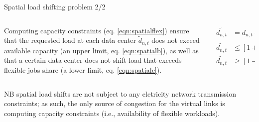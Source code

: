 \begin{frame}{Spatial load shifting problem 2/2}


  {\footnotesize
  \begin{columns}

    \begin{column}{6cm}
      Computing capacity constraints (eq. \ref{eqn:spatialflex}) ensure that the requested load at each data center  $\widetilde{d}_{n,t}$ does not exceed available capacity (an upper limit, eq. \ref{eqn:spatialb}), as well as that a certain data center does not shift load that exceeds flexible jobs share (a lower limit, eq. \ref{eqn:spatialc}).
    \end{column}

  \begin{column}{7cm}
    \begin{subequations}
      \begin{align}
          \widetilde{d_{n,t}} &=  d_{n,t} + \sum_{\vartheta \in \Theta_n^{rec}}\delta_{\vartheta, t} - \sum_{\vartheta \in \Theta_n^{snd}}\delta_{\vartheta, t} \quad \forall n \in N_{DC}, t \in T \label{eqn:spatiala} \\
          \widetilde{d_{n,t}} &\le [1+f] \cdot d_{n,t}  \quad \forall n \in N_{DC}, t \in T \label{eqn:spatialb} \\
          \widetilde{d_{n,t}} &\ge [1-f] \cdot d_{n,t}  \quad \forall n \in N_{DC}, t \in T \label{eqn:spatialc}
      \end{align}
      \label{eqn:spatialflex}
      \end{subequations}
  \end{column}
  \end{columns}

  \vspace{-0.1cm}
  NB spatial load shifts are not subject to any eletricity network transmission constraints; as such, the only source of congestion for the virtual links is computing capacity constraints (i.e., availability of flexible workloads). \\

}
\end{frame}
